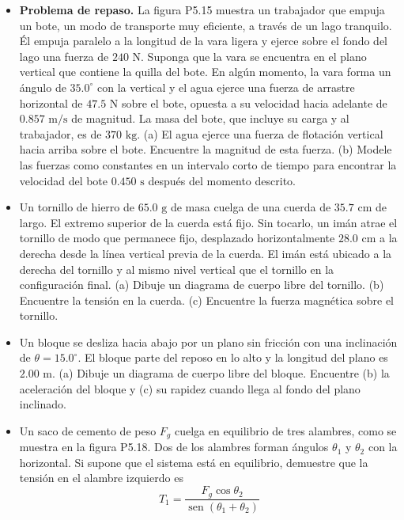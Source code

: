 \documentclass[11pt,a4paper]{article}
\begin{document}
\begin{itemize}
    \item[\textbf{15.}] \textbf{Problema de repaso.} La figura P5.15 muestra un trabajador que empuja un bote, un modo de transporte muy eficiente, a través de un lago tranquilo. Él empuja paralelo a la longitud de la vara ligera y ejerce sobre el fondo del lago una fuerza de $240 \text{ N}$. Suponga que la vara se encuentra en el plano vertical que contiene la quilla del bote. En algún momento, la vara forma un ángulo de $35.0^\circ$ con la vertical y el agua ejerce una fuerza de arrastre horizontal de $47.5 \text{ N}$ sobre el bote, opuesta a su velocidad hacia adelante de $0.857 \text{ m/s}$ de magnitud. La masa del bote, que incluye su carga y al trabajador, es de $370 \text{ kg}$. (a) El agua ejerce una fuerza de flotación vertical hacia arriba sobre el bote. Encuentre la magnitud de esta fuerza. (b) Modele las fuerzas como constantes en un intervalo corto de tiempo para encontrar la velocidad del bote $0.450 \text{ s}$ después del momento descrito.
    \vspace*{6cm}

    \item[\textbf{16.}] Un tornillo de hierro de $65.0 \text{ g}$ de masa cuelga de una cuerda de $35.7 \text{ cm}$ de largo. El extremo superior de la cuerda está fijo. Sin tocarlo, un imán atrae el tornillo de modo que permanece fijo, desplazado horizontalmente $28.0 \text{ cm}$ a la derecha desde la línea vertical previa de la cuerda. El imán está ubicado a la derecha del tornillo y al mismo nivel vertical que el tornillo en la configuración final. (a) Dibuje un diagrama de cuerpo libre del tornillo. (b) Encuentre la tensión en la cuerda. (c) Encuentre la fuerza magnética sobre el tornillo.
    \vspace*{7cm}

    \item[\textbf{17.}] Un bloque se desliza hacia abajo por un plano sin fricción con una inclinación de $\theta = 15.0^\circ$. El bloque parte del reposo en lo alto y la longitud del plano es $2.00 \text{ m}$. (a) Dibuje un diagrama de cuerpo libre del bloque. Encuentre (b) la aceleración del bloque y (c) su rapidez cuando llega al fondo del plano inclinado.
    \vspace*{7cm}

    \item[\textbf{18.}] Un saco de cemento de peso $F_g$ cuelga en equilibrio de tres alambres, como se muestra en la figura P5.18. Dos de los alambres forman ángulos $\theta_1$ y $\theta_2$ con la horizontal. Si supone que el sistema está en equilibrio, demuestre que la tensión en el alambre izquierdo es
    $$ T_1 = \frac{F_g \cos \theta_2}{\operatorname{sen}(\theta_1 + \theta_2)} $$
    \vspace*{6cm}
\end{itemize}
\end{document}
